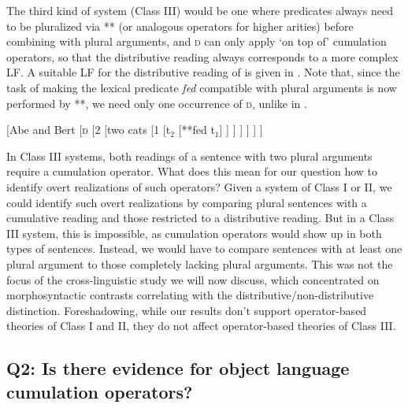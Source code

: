 \documentclass[output=paper]{langscibook}
\begin{document}
The third kind of system (Class III) would be one where predicates always need to be pluralized via ** (or analogous operators for higher arities) before combining with plural arguments, and \textsc{d} can only apply `on top of' cumulation operators, so that the distributive reading always corresponds to a more complex LF. A suitable LF for the distributive reading of  is given in . Note that, since the task of making the lexical predicate \textit{fed} compatible with plural arguments is now performed by **, we need only one occurrence of \textsc{d}, unlike in .

\ea \label{has-sch:15} {[Abe and Bert [\textsc{d} [2 [two cats [1 [t$_2$ [**fed t$_1$] ] ] ] ] ] ]} \z

\noindent In Class III systems, both readings of a sentence with two plural arguments require a cumulation operator. What does this mean for our question how to identify overt realizations of such operators? Given a system of Class I or II, we could identify such overt realizations by comparing plural sentences with a cumulative reading and those restricted to a distributive reading. But in a Class III system, this is impossible, as cumulation operators would show up in both types of sentences. Instead, we would have to compare sentences with at least one plural argument to those completely lacking plural arguments. This was not the focus of the cross-linguistic study we will now discuss,
which concentrated on morphosyntactic contrasts correlating with the distributive/non-distributive distinction. Foreshadowing, while our results don't support operator-based theories of Class I and II,  they do not affect operator-based theories of Class III.


\subsection{Q2: Is there evidence for object language cumulation operators?}\label{has-sch:sec:3.3}
\end{document}
